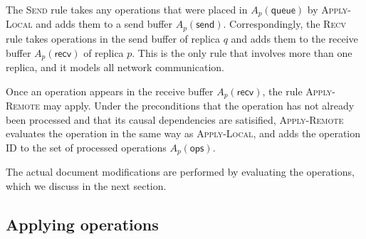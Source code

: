 \documentclass[10pt,journal,compsoc]{IEEEtran}
\begin{document}
The \textsc{Send} rule takes any operations that were placed in $A_p(\mathsf{queue})$ by \textsc{Apply-Local} and adds them to a send buffer $A_p(\mathsf{send})$. Correspondingly, the \textsc{Recv} rule takes operations in the send buffer of replica $q$ and adds them to the receive buffer $A_p(\mathsf{recv})$ of replica $p$. This is the only rule that involves more than one replica, and it models all network communication.

Once an operation appears in the receive buffer $A_p(\mathsf{recv})$, the rule \textsc{Apply-Remote} may apply. Under the preconditions that the operation has not already been processed and that its causal dependencies are satisified, \textsc{Apply-Remote} evaluates the operation in the same way as \textsc{Apply-Local}, and adds the operation ID to the set of processed operations $A_p(\mathsf{ops})$.

The actual document modifications are performed by evaluating the operations, which we discuss in the next section.

\subsection{Applying operations}
\end{document}
